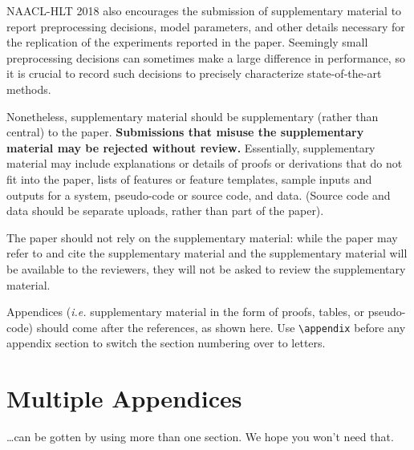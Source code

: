 \documentclass[11pt,a4paper]{article}
\begin{document}
NAACL-HLT 2018 also encourages the submission of supplementary material to report preprocessing decisions, model parameters, and other details necessary for the replication of the experiments reported in the paper. Seemingly small preprocessing decisions can sometimes make a large difference in performance, so it is crucial to record such decisions to precisely characterize state-of-the-art methods. 

Nonetheless, supplementary material should be supplementary (rather
than central) to the paper. {\bf Submissions that misuse the supplementary 
material may be rejected without review.}
Essentially, supplementary material may include explanations or details
of proofs or derivations that do not fit into the paper, lists of
features or feature templates, sample inputs and outputs for a system,
pseudo-code or source code, and data. (Source code and data should
be separate uploads, rather than part of the paper).

The paper should not rely on the supplementary material: while the paper
may refer to and cite the supplementary material and the supplementary material will be available to the
reviewers, they will not be asked to review the
supplementary material.


Appendices ({\em i.e.} supplementary material in the form of proofs, tables,
or pseudo-code) should come after the references, as shown here. Use
\verb|\appendix| before any appendix section to switch the section
numbering over to letters.

\section{Multiple Appendices}
\dots can be gotten by using more than one section. We hope you won't
need that.
\end{document}
